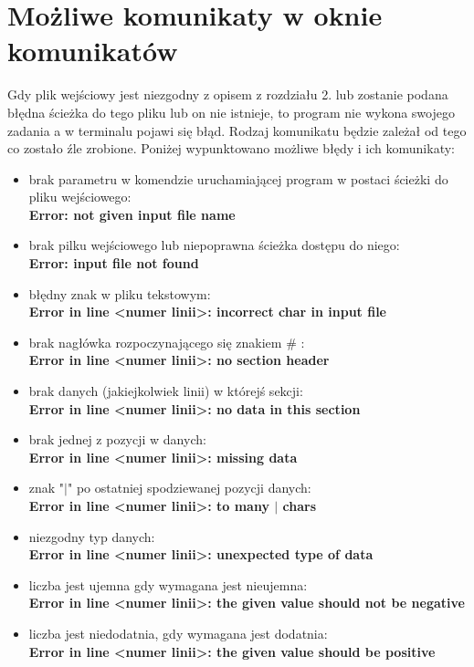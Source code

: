 \documentclass[10pt,a4paper]{article}
\begin{document}
\section{Możliwe komunikaty w oknie komunikatów}
Gdy plik wejściowy jest niezgodny z opisem z rozdziału 2. lub zostanie podana błędna ścieżka do tego pliku lub on nie istnieje, to program nie wykona swojego zadania a w terminalu pojawi się błąd. Rodzaj komunikatu będzie zależał od tego co zostało źle zrobione. Poniżej wypunktowano możliwe błędy i ich komunikaty:
\begin{itemize}
\item brak parametru w komendzie uruchamiającej program w postaci ścieżki do pliku wejściowego:\\ \textbf{Error: not given input file name}
\item brak pilku wejściowego lub niepoprawna ścieżka dostępu do niego:\\ 			\textbf{Error: input file not found}
\item błędny znak w pliku tekstowym: \\ \textbf{Error in line \textless numer linii\textgreater: incorrect char in input file}
\item brak nagłówka rozpoczynającego się znakiem \# :\\ \textbf{Error in line \textless numer linii\textgreater: no section header}
\item brak danych (jakiejkolwiek linii) w którejś sekcji: \\ \textbf{Error in line \textless numer linii\textgreater: no data in this section}
\item brak jednej z pozycji w danych: \\ \textbf{Error in line \textless numer linii\textgreater: missing data}
\item znak "$\mid$" po ostatniej spodziewanej pozycji danych: \\ \textbf{Error in line \textless numer linii\textgreater: to many $\mid$ chars}
\item niezgodny typ danych: \\ \textbf{Error in line \textless numer linii\textgreater: unexpected type of data}
\item liczba jest ujemna gdy wymagana jest nieujemna: \\ \textbf{Error in line \textless numer linii\textgreater: the given value should not be negative}
\item liczba jest niedodatnia, gdy wymagana jest dodatnia: \\ \textbf{Error in line \textless numer linii\textgreater: the given value should be positive}

\end{itemize}
\end{document}
